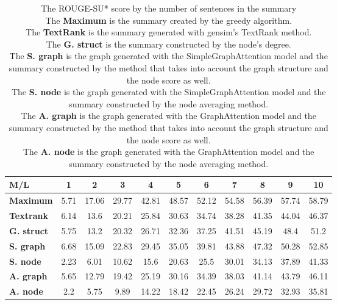 \begin{table}[!ht]
	\centering
	\begin{tabular}{| l | c | c | c | c | c | c | c | c | c | c |}
		\hline
		\textbf{M/L}&\textbf{1}&\textbf{2}&\textbf{3}&\textbf{4}&\textbf{5}&\textbf{6}&\textbf{7}&\textbf{8}&\textbf{9}&\textbf{10} \\ \hline \hline
		\textbf{Maximum}&5.71&17.06&29.77&42.81&48.57&52.12&54.58&56.39&57.74&58.79 \\ \hline
		\textbf{Textrank}&6.14&13.6&20.21&25.84&30.63&34.74&38.28&41.35&44.04&46.37 \\ \hline
		\textbf{G. struct}&5.75&13.2&20.32&26.71&32.36&37.25&41.51&45.19&48.4&51.2 \\ \hline
		\textbf{S. graph}&6.68&15.09&22.83&29.45&35.05&39.81&43.88&47.32&50.28&52.85 \\ \hline
		\textbf{S. node}&2.23&6.01&10.62&15.6&20.63&25.5&30.01&34.13&37.89&41.33 \\ \hline
		\textbf{A. graph}&5.65&12.79&19.42&25.19&30.16&34.39&38.03&41.14&43.79&46.11 \\ \hline
		\textbf{A. node}&2.2&5.75&9.89&14.22&18.42&22.45&26.24&29.72&32.93&35.81 \\ \hline
	\end{tabular}
	\caption{The ROUGE-SU* score by the number of sentences in the summary
		\\ The \textbf{Maximum} is the summary created by the greedy algorithm.
		\\ The \textbf{TextRank} is the summary generated with gensim's TextRank method. 
		\\The \textbf{G. struct} is the summary constructed by the node's degree.
		\\ The \textbf{S. graph} is the graph generated with the SimpleGraphAttention model and the summary constructed by the method that takes into account the graph structure and the node score as well.
		\\ The \textbf{S. node} is the graph generated with the SimpleGraphAttention model and the summary constructed by the node averaging method.
		\\ The \textbf{A. graph} is the graph generated with the GraphAttention model and the summary constructed by the method that takes into account the graph structure and the node score as well.
		\\ The \textbf{A. node} is the graph generated with the GraphAttention model and the summary constructed by the node averaging method.}
	\label{tab:ROUGE-SU}
\end{table}
